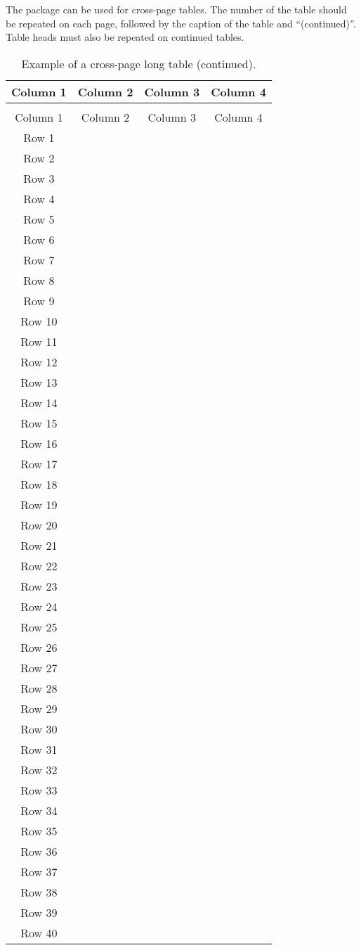 The package  can be used for cross-page tables.
The number of the table should be repeated on each page, followed by the caption of the table and ``(continued)''. Table heads must also be repeated on continued tables.

\begin{longtable}{cccc}
    \caption{Example of a cross-page long table.} \\
    \toprule
    Column 1 & Column 2 & Column 3 & Column 4 \\
    \midrule
  \endfirsthead
    \caption[]{Example of a cross-page long table (continued).} \\
    \toprule
    Column 1 & Column 2 & Column 3 & Column 4 \\
    \midrule
  \endhead
    \bottomrule
  \endfoot
  Row 1  & & & \\
  Row 2  & & & \\
  Row 3  & & & \\
  Row 4  & & & \\
  Row 5  & & & \\
  Row 6  & & & \\
  Row 7  & & & \\
  Row 8  & & & \\
  Row 9  & & & \\
  Row 10 & & & \\
  Row 11 & & & \\
  Row 12 & & & \\
  Row 13 & & & \\
  Row 14 & & & \\
  Row 15 & & & \\
  Row 16 & & & \\
  Row 17 & & & \\
  Row 18 & & & \\
  Row 19 & & & \\
  Row 20 & & & \\
  Row 21 & & & \\
  Row 22 & & & \\
  Row 23 & & & \\
  Row 24 & & & \\
  Row 25 & & & \\
  Row 26 & & & \\
  Row 27 & & & \\
  Row 28 & & & \\
  Row 29 & & & \\
  Row 30 & & & \\
  Row 31 & & & \\
  Row 32 & & & \\
  Row 33 & & & \\
  Row 34 & & & \\
  Row 35 & & & \\
  Row 36 & & & \\
  Row 37 & & & \\
  Row 38 & & & \\
  Row 39 & & & \\
  Row 40 & & & \\
\end{longtable}
